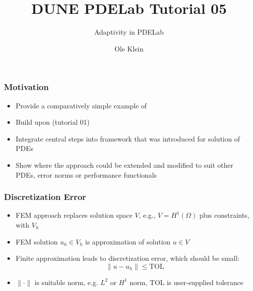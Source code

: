\documentclass[aspectratio=169,11pt]{beamer}
\title{DUNE PDELab Tutorial 05}
\subtitle{Adaptivity in PDELab}
\author{Ole Klein}
\institute[]
{
  IWR\\
  Heidelberg University
}
\theoremstyle{definition}
\begin{document}


\begin{frame}
\frametitle{Motivation}
\begin{itemize}
  \item Provide a comparatively simple example of 
  \item Build upon  (tutorial 01)
  \item Integrate central steps into framework that was introduced for
    solution of PDEs
  \item Show where the approach could be extended and modified to suit other PDEs,
    error norms or performance functionals
\end{itemize}
\end{frame}

\begin{frame}
\frametitle{Discretization Error}
\begin{itemize}
  \item FEM approach replaces solution space $V$, e.g., $V=H^1(\Omega)$ plus
    constraints, with  $V_h$
  \item FEM solution $u_h \in V_h$ is approximation of solution $u \in V$
  \item Finite approximation leads to discretization error, which should be small:
    \begin{equation*}
      \| u - u_h \| \leq \text{TOL}
    \end{equation*}
  \item $\| \cdot \|$ is suitable norm, e.g. $L^2$ or $H^1$ norm, $\text{TOL}$ is
    user-supplied tolerance
\end{itemize}
\end{frame}
\end{document}
